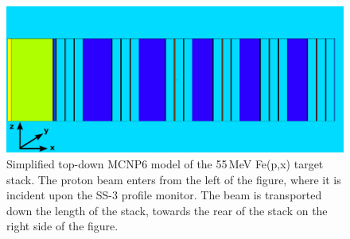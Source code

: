 % 
% 
%

\begin{figure}
 \centering
 \includegraphics[trim = 0mm 0mm 2mm 0mm, clip,width=0.75\columnwidth]{./figures/ipf_stack_nolabels_axes.PNG}
 \caption{Simplified top-down MCNP6 model of the 55\,MeV Fe(p,x) target stack. The  proton beam enters from the left of the figure, where it is incident upon the SS-3 profile monitor. The beam is transported down the length of the stack, towards the rear of the stack on the right side of the figure.
}
 \label{fig:fe_vised_55}
\end{figure}



